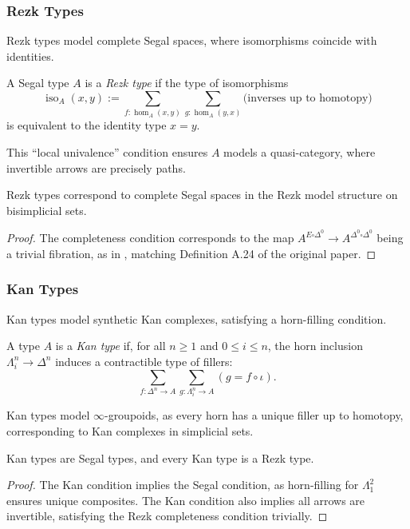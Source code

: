 \documentclass{article}
\begin{document}
\subsubsection{Rezk Types}

Rezk types model complete Segal spaces, where isomorphisms coincide with identities.

\begin{definition}
A Segal type $A$ is a \emph{Rezk type} if the type of isomorphisms
\[
\operatorname{iso}_A(x, y) := \sum_{f : \operatorname{hom}_A(x,y)} \sum_{g : \operatorname{hom}_A(y,x)} \text{(inverses up to homotopy)}
\]
is equivalent to the identity type $x = y$.
\end{definition}

This “local univalence” condition ensures $A$ models a quasi-category, where invertible arrows are precisely paths.

\begin{theorem}
Rezk types correspond to complete Segal spaces in the Rezk model structure on bisimplicial sets.
\end{theorem}
\begin{proof}
The completeness condition corresponds to the map $A^{E \square \Delta^0} \to A^{\Delta^0 \square \Delta^0}$ being a trivial fibration, as in \cite{Shu15}, matching Definition A.24 of the original paper.
\end{proof}

\subsubsection{Kan Types}

Kan types model synthetic Kan complexes, satisfying a horn-filling condition.

\begin{definition}
A type $A$ is a \emph{Kan type} if, for all $n \geq 1$ and $0 \leq i \leq n$, the horn inclusion $\Lambda^n_i \to \Delta^n$ induces a contractible type of fillers:
\[
\sum_{f : \Delta^n \to A} \sum_{g : \Lambda^n_i \to A} \left( g = f \circ \iota \right).
\]
\end{definition}

Kan types model $\infty$-groupoids, as every horn has a unique filler up to homotopy, corresponding to Kan complexes in simplicial sets.

\begin{theorem}
Kan types are Segal types, and every Kan type is a Rezk type.
\end{theorem}
\begin{proof}
The Kan condition implies the Segal condition, as horn-filling for $\Lambda^2_1$ ensures unique composites. The Kan condition also implies all arrows are invertible, satisfying the Rezk completeness condition trivially.
\end{proof}
\end{document}
